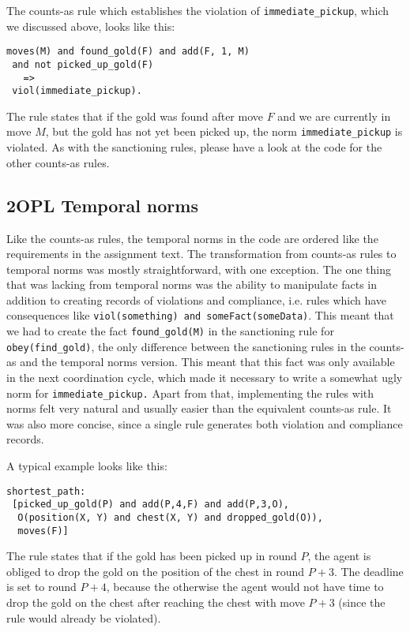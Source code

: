 \documentclass[a4paper,11pt]{article}
\begin{document}
The counts-as rule which establishes the violation of \texttt{immediate\_pickup}, which we discussed above, looks like this:

\begin{lstlisting}[basicstyle=\footnotesize]
moves(M) and found_gold(F) and add(F, 1, M) 
 and not picked_up_gold(F) 
   => 
 viol(immediate_pickup).
\end{lstlisting}

The rule states that if the gold was found after move $F$ and we are currently in move $M$, but the gold has not yet been picked up, the norm \texttt{immediate\_pickup} is violated. As with the sanctioning rules, please have a look at the code for the other counts-as rules.

\subsection{2OPL Temporal norms}
\label{sec:norms}
Like the counts-as rules, the temporal norms in the code are ordered like the requirements in the assignment text. The transformation from counts-as rules to temporal norms was mostly straightforward, with one exception. The one thing that was lacking from temporal norms was the ability to manipulate facts in addition to creating records of violations and compliance, i.e. rules which have consequences like \texttt{viol(something) and someFact(someData)}. This meant that we had to create the fact \texttt{found\_gold(M)} in the sanctioning rule for \texttt{obey(find\_gold)}, the only difference between the sanctioning rules in the counts-as and the temporal norms version. This meant that this fact was only available in the next coordination cycle, which made it necessary to write a somewhat ugly norm for \texttt{immediate\_pickup.} Apart from that, implementing the rules with norms felt very natural and usually easier than the equivalent counts-as rule. It was also more concise, since a single rule generates both violation and compliance records.

A typical example looks like this:

\begin{lstlisting}[basicstyle=\footnotesize]
shortest_path: 
 [picked_up_gold(P) and add(P,4,F) and add(P,3,O), 
  O(position(X, Y) and chest(X, Y) and dropped_gold(O)), 
  moves(F)]
\end{lstlisting}

The rule states that if the gold has been picked up in round $P$, the agent is obliged to drop the gold on the position of the chest in round $P+3$. The deadline is set to round $P+4$, because the otherwise the agent would not have time to drop the gold on the chest after reaching the chest with move $P+3$ (since the rule would already be violated).
\end{document}
